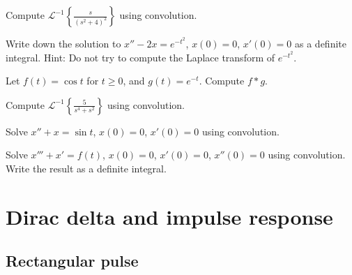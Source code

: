 \begin{exercise}
Compute ${\mathcal{L}}^{-1} \left\{ \frac{s}{{(s^2+4)}^2} \right\}$ using
convolution.
\end{exercise}

\begin{exercise}
Write down the solution to
$x''-2x=e^{-t^2}$, $x(0)=0$, $x'(0)=0$ as a
definite integral.  Hint: Do not try to compute the
Laplace transform of $e^{-t^2}$.
\end{exercise}

\setcounter{exercise}{100}

\begin{exercise}
Let $f(t) = \cos t$ for $t \geq 0$, and $g(t) = e^{-t}$.  Compute
$f * g$.
\end{exercise}

\begin{exercise}
Compute ${\mathcal{L}}^{-1} \left\{ \frac{5}{s^4+s^2} \right\}$ using
convolution.
\end{exercise}

\begin{exercise}
Solve $x''+x = \sin t$, $x(0) = 0$, $x'(0)=0$ using convolution.
\end{exercise}

\begin{exercise}
Solve $x'''+x' = f(t)$, $x(0) = 0$, $x'(0)=0$, $x''(0)=0$ using convolution.
Write the result as a definite integral.
\end{exercise}


\sectionnewpage
\section{Dirac delta and impulse response}
\label{diracdelta:section}


\subsection{Rectangular pulse}

